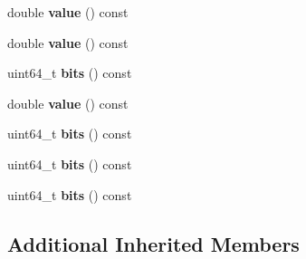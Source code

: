 \begin{DoxyCompactItemize}
\item 
double {\bfseries value} () const \hypertarget{classv8_1_1internal_1_1_l_constant_d_acd409d6aa1863baa820ef1621c161aed}{}\label{classv8_1_1internal_1_1_l_constant_d_acd409d6aa1863baa820ef1621c161aed}

\item 
double {\bfseries value} () const \hypertarget{classv8_1_1internal_1_1_l_constant_d_acd409d6aa1863baa820ef1621c161aed}{}\label{classv8_1_1internal_1_1_l_constant_d_acd409d6aa1863baa820ef1621c161aed}

\item 
uint64\+\_\+t {\bfseries bits} () const \hypertarget{classv8_1_1internal_1_1_l_constant_d_a27d8c4df59c309644f4283209e42ac5c}{}\label{classv8_1_1internal_1_1_l_constant_d_a27d8c4df59c309644f4283209e42ac5c}

\item 
double {\bfseries value} () const \hypertarget{classv8_1_1internal_1_1_l_constant_d_acd409d6aa1863baa820ef1621c161aed}{}\label{classv8_1_1internal_1_1_l_constant_d_acd409d6aa1863baa820ef1621c161aed}

\item 
uint64\+\_\+t {\bfseries bits} () const \hypertarget{classv8_1_1internal_1_1_l_constant_d_a27d8c4df59c309644f4283209e42ac5c}{}\label{classv8_1_1internal_1_1_l_constant_d_a27d8c4df59c309644f4283209e42ac5c}

\item 
uint64\+\_\+t {\bfseries bits} () const \hypertarget{classv8_1_1internal_1_1_l_constant_d_a27d8c4df59c309644f4283209e42ac5c}{}\label{classv8_1_1internal_1_1_l_constant_d_a27d8c4df59c309644f4283209e42ac5c}

\item 
uint64\+\_\+t {\bfseries bits} () const \hypertarget{classv8_1_1internal_1_1_l_constant_d_a27d8c4df59c309644f4283209e42ac5c}{}\label{classv8_1_1internal_1_1_l_constant_d_a27d8c4df59c309644f4283209e42ac5c}

\end{DoxyCompactItemize}
\subsection*{Additional Inherited Members}


